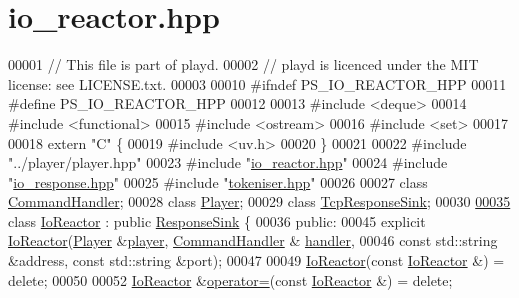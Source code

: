 \hypertarget{io__reactor_8hpp_source}{\section{io\+\_\+reactor.\+hpp}
\label{io__reactor_8hpp_source}
}

\begin{DoxyCode}
00001 \textcolor{comment}{// This file is part of playd.}
00002 \textcolor{comment}{// playd is licenced under the MIT license: see LICENSE.txt.}
00003 
00010 \textcolor{preprocessor}{#ifndef PS\_IO\_REACTOR\_HPP}
00011 \textcolor{preprocessor}{#define PS\_IO\_REACTOR\_HPP}
00012 
00013 \textcolor{preprocessor}{#include <deque>}
00014 \textcolor{preprocessor}{#include <functional>}
00015 \textcolor{preprocessor}{#include <ostream>}
00016 \textcolor{preprocessor}{#include <set>}
00017 
00018 \textcolor{keyword}{extern} \textcolor{stringliteral}{"C"} \{
00019 \textcolor{preprocessor}{#include <uv.h>}
00020 \}
00021 
00022 \textcolor{preprocessor}{#include "../player/player.hpp"}
00023 \textcolor{preprocessor}{#include "\hyperlink{io__reactor_8hpp}{io\_reactor.hpp}"}
00024 \textcolor{preprocessor}{#include "\hyperlink{io__response_8hpp}{io\_response.hpp}"}
00025 \textcolor{preprocessor}{#include "\hyperlink{tokeniser_8hpp}{tokeniser.hpp}"}
00026 
00027 \textcolor{keyword}{class }\hyperlink{classCommandHandler}{CommandHandler};
00028 \textcolor{keyword}{class }\hyperlink{classPlayer}{Player};
00029 \textcolor{keyword}{class }\hyperlink{classTcpResponseSink}{TcpResponseSink};
00030 
\hypertarget{io__reactor_8hpp_source_l00035}{}\hyperlink{classIoReactor}{00035} \textcolor{keyword}{class }\hyperlink{classIoReactor}{IoReactor} : \textcolor{keyword}{public} \hyperlink{classResponseSink}{ResponseSink} \{
00036 \textcolor{keyword}{public}:
00045     \textcolor{keyword}{explicit} \hyperlink{classIoReactor_aace954427c447c73caf6b8dbcd367284}{IoReactor}(\hyperlink{classPlayer}{Player} &\hyperlink{classIoReactor_a795397b36da55b59bff63b455a344dea}{player}, \hyperlink{classCommandHandler}{CommandHandler} &
      \hyperlink{classIoReactor_a81bf838edb7adf1edcb992bfe61d6b78}{handler},
00046                        \textcolor{keyword}{const} std::string &address, \textcolor{keyword}{const} std::string &port);
00047 
00049     \hyperlink{classIoReactor_aace954427c447c73caf6b8dbcd367284}{IoReactor}(\textcolor{keyword}{const} \hyperlink{classIoReactor}{IoReactor} &) = \textcolor{keyword}{delete};
00050 
00052     \hyperlink{classIoReactor}{IoReactor} &\hyperlink{classIoReactor_a5e05bcbdf86f3124adb67ce76bf4f8a9}{operator=}(\textcolor{keyword}{const} \hyperlink{classIoReactor}{IoReactor} &) = \textcolor{keyword}{delete};

\end{DoxyCode}
